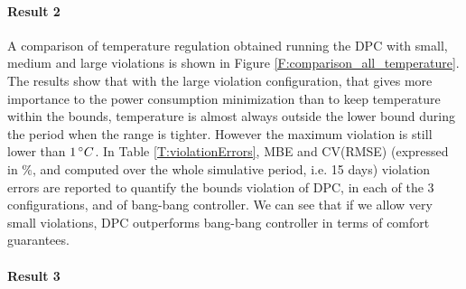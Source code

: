 \paragraph{Result 2} A comparison of temperature regulation obtained running the DPC with small, medium and large violations is shown in Figure \ref{F:comparison_all_temperature}. The results show that with the large violation configuration, that gives more importance to the power consumption minimization than to keep temperature within the bounds, temperature is almost always outside the lower bound during the period when the range is tighter. However the maximum violation is still lower than $1\,\degree C$.
In Table \ref{T:violationErrors}, MBE and CV(RMSE)\textcolor[rgb]{0,0,1}{ (expressed in $\%$, and computed over the whole simulative period, i.e. 15 days) }violation errors are reported to quantify the bounds violation of DPC, in each of the $3$ configurations, and of bang-bang controller. We can see that if we allow very small violations, DPC outperforms bang-bang controller in terms of comfort guarantees.

\paragraph{Result 3} 

